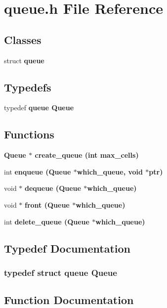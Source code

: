 \section{queue.h File Reference}
\label{queue_8h}
\subsection*{Classes}
\begin{CompactItemize}
\item 
struct \bf{queue}
\end{CompactItemize}
\subsection*{Typedefs}
\begin{CompactItemize}
\item 
typedef \bf{queue} \bf{Queue}
\end{CompactItemize}
\subsection*{Functions}
\begin{CompactItemize}
\item 
\bf{Queue} $\ast$ \bf{create\_\-queue} (int max\_\-cells)
\item 
int \bf{enqueue} (\bf{Queue} $\ast$which\_\-queue, void $\ast$ptr)
\item 
void $\ast$ \bf{dequeue} (\bf{Queue} $\ast$which\_\-queue)
\item 
void $\ast$ \bf{front} (\bf{Queue} $\ast$which\_\-queue)
\item 
int \bf{delete\_\-queue} (\bf{Queue} $\ast$which\_\-queue)
\end{CompactItemize}


\subsection{Typedef Documentation}
\subsubsection{\setlength{\rightskip}{0pt plus 5cm}typedef struct \bf{queue} \bf{Queue}}\label{queue_8h_6f23aa91ac8f9ef00f6b1c1a9d017e9a}




\subsection{Function Documentation}

